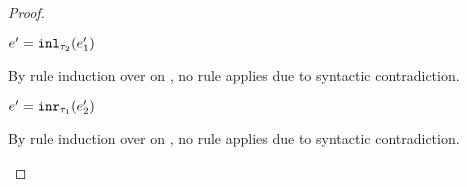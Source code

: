 \begin{proof}
\begin{byCases}
\begin{byCases}
\begin{byCases}
\begin{byCases}
\begin{byCases}
\begin{byCases}
              \item[\text{(\ref{rule:VInl})}] 
              \begin{pfsteps*} 
              \item $e'=\mathtt{inl}_{\tau_2}({e_1'})$ 
              \end{pfsteps*}
              By rule induction over  on , no rule applies due to syntactic contradiction.
              \item[\text{(\ref{rule:VInr})}] 
              \begin{pfsteps*} 
              \item $e'=\mathtt{inr}_{\tau_1}({e_2'})$ 
              \end{pfsteps*}
              By rule induction over  on , no rule applies due to syntactic contradiction.
            \end{byCases}
          \end{byCases}
        \end{byCases}
        

\end{byCases}
\end{byCases}
\end{byCases}
\end{proof}

